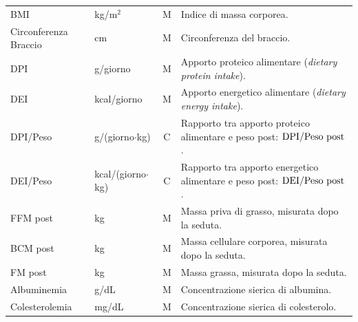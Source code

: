 \documentclass[a4paper,12pt]{report}
\begin{document}
\begin{longtable}{@{}>{\raggedright\arraybackslash}p{3.1cm}
                   >{\raggedright\arraybackslash}p{2.4cm}
                   c
                   >{\raggedright\arraybackslash}p{7.0cm}@{}}
\multicolumn{4}{@{}l}{\textbf{Valori nutrizionali}} \\
\midrule
BMI & kg/m$^2$ & M & Indice di massa corporea. \\
Circonferenza Braccio & cm & M & Circonferenza del braccio. \\
DPI & g/giorno & M & Apporto proteico alimentare (\emph{dietary protein intake}). \\
DEI & kcal/giorno & M & Apporto energetico alimentare (\emph{dietary energy intake}). \\
DPI/Peso & g/(giorno$\cdot$kg) & C & Rapporto tra apporto proteico alimentare e peso post: $\text{DPI}/\text{Peso post}$. \\
DEI/Peso & kcal\slash(giorno$\cdot$kg) & C & Rapporto tra apporto energetico alimentare e peso post: $\text{DEI}/\text{Peso post}$. \\
FFM post & kg & M & Massa priva di grasso, misurata dopo la seduta. \\
BCM post & kg & M & Massa cellulare corporea, misurata dopo la seduta. \\
FM post & kg & M & Massa grassa, misurata dopo la seduta. \\
Albuminemia & g/dL & M & Concentrazione sierica di albumina. \\
Colesterolemia & mg/dL & M & Concentrazione sierica di colesterolo. \\
\midrule


\end{longtable}
\end{document}
